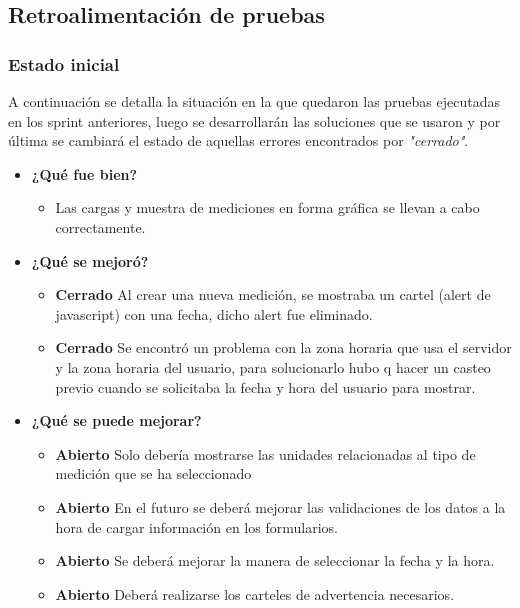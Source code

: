 \subsection{Retroalimentación de pruebas}
\subsubsection{Estado inicial}
A continuación se detalla la situación en la que quedaron las pruebas ejecutadas en los sprint anteriores, luego se desarrollarán las soluciones que se usaron y por última se cambiará el estado de aquellas errores encontrados por \textit{"cerrado"}.
	\begin{itemize}
		\item \textbf{¿Qué fue bien?}
        	\begin{itemize}
				\item        Las cargas y muestra de mediciones en forma gráfica se llevan a cabo correctamente.
			\end{itemize}

   		\item \textbf{¿Qué se mejoró?}
        	\begin{itemize}
				\item \textbf{Cerrado} Al crear una nueva medición, se mostraba un cartel (alert de javascript) con una fecha, dicho alert fue eliminado.
                \item \textbf{Cerrado} Se encontró un problema con la zona horaria que usa el servidor y la zona horaria del usuario, para solucionarlo hubo q hacer un casteo previo cuando se solicitaba la fecha y hora del usuario para mostrar.
			\end{itemize}

   		\item \textbf{¿Qué se puede mejorar?}
        	\begin{itemize}
		        \item \textbf{Abierto} Solo debería mostrarse las unidades relacionadas al tipo de medición que se ha seleccionado 
				\item \textbf{Abierto} En el futuro se deberá mejorar las validaciones de los datos a la hora de cargar información en los formularios.
        		\item \textbf{Abierto} Se deberá mejorar la manera de seleccionar la fecha y la hora. 
                \item \textbf{Abierto} Deberá realizarse los carteles de advertencia necesarios.
            \end{itemize}
       
	\end{itemize}



